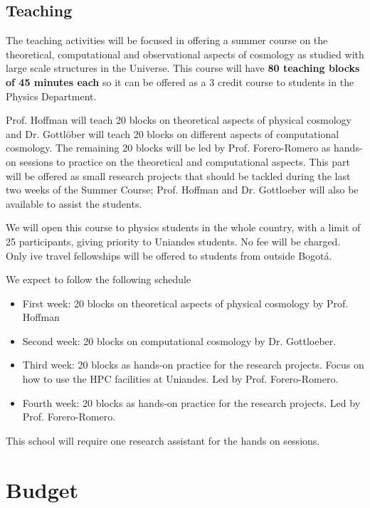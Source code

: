 \documentclass[12pt]{article}
\begin{document}
\subsection{Teaching}


The teaching activities will be focused in offering a summer course on
the theoretical, computational and observational aspects of cosmology
as studied with large scale structures in the Universe. This course
will have {\bf 80 teaching blocks of 45 minutes each} so it can be
offered as a 3 credit course to students in the Physics Department. 


Prof. Hoffman will teach 20 blocks on theoretical aspects
of physical cosmology and Dr. Gottl\"ober will teach 20 blocks on
different aspects of computational cosmology. The remaining 20
blocks will be led by Prof. Forero-Romero as hands-on sessions to practice on
the theoretical and computational aspects. This part will be offered
as small research projects that should be tackled during the last two
weeks of the Summer Course; Prof. Hoffman and Dr. Gottloeber will also
be available to assist the students.

We will open this course to physics students in the whole country,
with a limit of 25 participants, giving priority to Uniandes
students. No fee will be charged. Only ive travel fellowships will be
offered to students from outside Bogot\'a. 

We expect to follow the following schedule

\begin{itemize}
\item{First week: 20 blocks on theoretical aspects of physical
  cosmology by Prof. Hoffman}
\item{Second week: 20 blocks on computational cosmology by
  Dr. Gottloeber.}
\item{Third week: 20 blocks as hands-on practice for the research
  projects. Focus on how to use the HPC facilities at Uniandes. Led by
  Prof. Forero-Romero.} 
\item{Fourth week: 20 blocks as hands-on practice for the research
  projects. Led by Prof. Forero-Romero.}
\end{itemize}

This school will require one research assistant for the hands on
sessions. 

\section{Budget}
\end{document}
